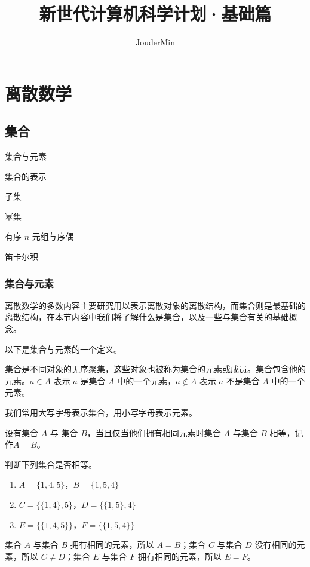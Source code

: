 \documentclass[lang=cn, chinesefont=founder, math=cm, color=cyan, citestyle=gb7714-2015, bibstyle=gb7714-2015]{elegantbook}
\title{新世代计算机科学计划·基础篇}
\author{JouderMin}
\institute{「新世代计算机科学计划」制作委员会}
\date{\zhtoday}
\begin{document}
\maketitle
\frontmatter

\tableofcontents

\mainmatter

\chapter{离散数学}
\section{集合}
\begin{introduction}
    \item 集合与元素
    \item 集合的表示
    \item 子集
    \item 幂集
    \item 有序 $n$ 元组与序偶
    \item 笛卡尔积
\end{introduction}

\subsection{集合与元素}
离散数学的多数内容主要研究用以表示离散对象的离散结构，而集合则是最基础的离散结构，在本节内容中我们将了解什么是集合，以及一些与集合有关的基础概念。

以下是集合与元素的一个定义。
\begin{definition}[集合与元素]\label{def:集合与元素}
    集合是不同对象的无序聚集，这些对象也被称为集合的元素或成员。集合包含他的元素。$a \in A$ 表示 $a$ 是集合 $A$ 中的一个元素，$a \notin A$ 表示 $a$ 不是集合 $A$ 中的一个元素。
\end{definition}

我们常用大写字母表示集合，用小写字母表示元素。
\begin{definition}[相等的集合]\label{def:相等的集合}
    设有集合 $A$ 与 集合 $B$，当且仅当他们拥有相同元素时集合 $A$ 与集合 $B$ 相等，记作$A = B$。
\end{definition}

\begin{collections}
    \begin{example}
        判断下列集合是否相等。
        \begin{enumerate}
            \item $A = \{ 1, 4, 5 \}$，$B = \{ 1, 5 ,4 \}$
            \item $C = \{ \{ 1, 4 \}, 5 \}$，$D = \{ \{ 1, 5 \}, 4 \}$
            \item $E = \{ \{ 1, 4, 5 \} \}$，$F = \{ \{ 1, 5, 4 \} \}$
        \end{enumerate}
    \end{example}
    \begin{solution}
        集合 $A$ 与集合 $B$ 拥有相同的元素，所以 $A = B$；集合 $C$ 与集合 $D$ 没有相同的元素，所以 $C \neq D$；集合 $E$ 与集合 $F$ 拥有相同的元素，所以 $E = F$。
    \end{solution}
\end{collections}
\end{document}
